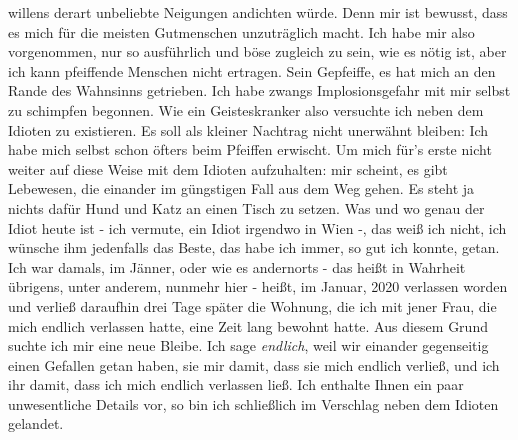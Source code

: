 \documentclass{scrbook}
\begin{document}
willens derart unbeliebte Neigungen andichten würde. Denn mir ist bewusst,
dass es mich für die meisten Gutmenschen unzuträglich macht. Ich habe mir
also vorgenommen, nur so ausführlich und böse zugleich zu sein, wie es nötig
ist, aber ich kann pfeiffende Menschen nicht ertragen. Sein Gepfeiffe, es hat
mich an den Rande des Wahnsinns getrieben. Ich habe zwangs Implosionsgefahr
mit mir selbst zu schimpfen begonnen. Wie ein Geisteskranker also versuchte
ich neben dem Idioten zu existieren. Es soll als kleiner Nachtrag nicht
unerwähnt bleiben: Ich habe mich selbst schon öfters beim Pfeiffen erwischt.
Um mich für's erste nicht weiter auf diese Weise mit dem Idioten aufzuhalten:
mir scheint, es gibt Lebewesen, die einander im güngstigen Fall aus dem Weg
gehen. Es steht ja nichts dafür Hund und Katz an einen Tisch zu setzen. Was
und wo genau der Idiot heute ist - ich vermute, ein Idiot irgendwo in Wien -,
das weiß ich nicht, ich wünsche ihm jedenfalls das Beste, das habe ich immer,
so gut ich konnte, getan. Ich war damals, im Jänner, oder wie es andernorts -
das heißt in Wahrheit übrigens, unter anderem, nunmehr hier - heißt, im
Januar, 2020 verlassen worden und verließ daraufhin drei Tage später die
Wohnung, die ich mit jener Frau, die mich endlich verlassen hatte, eine Zeit
lang bewohnt hatte. Aus diesem Grund suchte ich mir eine neue Bleibe. Ich
sage \textit{endlich}, weil wir einander gegenseitig einen Gefallen getan
haben, sie mir damit, dass sie mich endlich verließ, und ich ihr damit, dass
ich mich endlich verlassen ließ. Ich enthalte Ihnen ein paar unwesentliche
Details vor, so bin ich schließlich im Verschlag neben dem Idioten gelandet.
\end{document}
